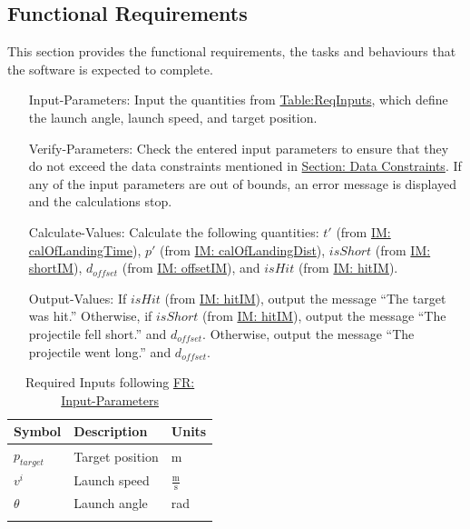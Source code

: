 \documentclass[12pt]{article}
\begin{document}
\subsection{Functional Requirements}
\label{Sec:FRs}
This section provides the functional requirements, the tasks and behaviours that the software is expected to complete.
\begin{itemize}
\item[Input-Parameters:\phantomsection\label{inputParams}]Input the quantities from \hyperref[Table:ReqInputs]{Table:ReqInputs}, which define the launch angle, launch speed, and target position.
\item[Verify-Parameters:\phantomsection\label{verifyParams}]Check the entered input parameters to ensure that they do not exceed the data constraints mentioned in \hyperref[Sec:DataConstraints]{Section: Data Constraints}. If any of the input parameters are out of bounds, an error message is displayed and the calculations stop.
\item[Calculate-Values:\phantomsection\label{calcValues}]Calculate the following quantities: $t'$ (from \hyperref[IM:calOfLandingTime]{IM: calOfLandingTime}), $p'$ (from \hyperref[IM:calOfLandingDist]{IM: calOfLandingDist}), $isShort$ (from \hyperref[IM:shortIM]{IM: shortIM}), ${d_{offset}}$ (from \hyperref[IM:offsetIM]{IM: offsetIM}), and $isHit$ (from \hyperref[IM:hitIM]{IM: hitIM}).
\item[Output-Values:\phantomsection\label{outputValues}]If $isHit$ (from \hyperref[IM:hitIM]{IM: hitIM}), output the message ``The target was hit.'' Otherwise, if $isShort$ (from \hyperref[IM:hitIM]{IM: hitIM}), output the message ``The projectile fell short.'' and ${d_{offset}}$. Otherwise, output the message ``The projectile went long.'' and ${d_{offset}}$.
\end{itemize}
\begin{longtable}{l l l}
\toprule
Symbol & Description & Units
\\
\midrule
\endhead
${p_{target}}$ & Target position & m
\\
${v^{i}}$ & Launch speed & $\frac{\text{m}}{\text{s}}$
\\
$θ$ & Launch angle & rad
\\
\bottomrule
\caption{Required Inputs following \hyperref[inputParams]{FR: Input-Parameters}}
\label{Table:ReqInputs}
\end{longtable}
\end{document}
